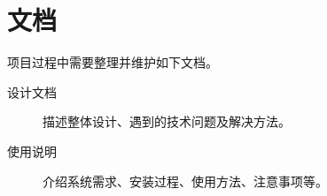 \section{文档}\label{doc}

项目过程中需要整理并维护如下文档。

\begin{description}
    \item[设计文档] 描述整体设计、遇到的技术问题及解决方法。
    \item[使用说明] 介绍系统需求、安装过程、使用方法、注意事项等。
\end{description}

\clearpage
